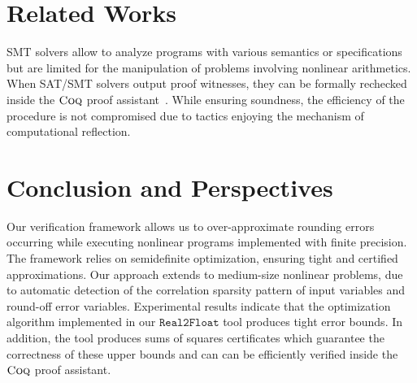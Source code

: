 \documentclass[preprint]{sigplanconf}
\newcommand{\realtofloat}{\mathtt{Real2Float}}
\newcommand{\op}{\mathtt{op}}
\newcommand{\coq}{\text{\sc Coq}}
\newcommand{\fptaylor}{\mathtt{FPTaylor}}
\theoremstyle{plain}
\begin{document}



\section{Related Works}
%
SMT solvers allow to analyze programs with various semantics or specifications but are limited for the manipulation of problems involving nonlinear arithmetics. When SAT/SMT solvers output proof witnesses, they can be formally rechecked inside the $\coq$ proof assistant~\cite{smtcoq}. While ensuring soundness, the efficiency of the procedure is not compromised due to tactics enjoying the mechanism of computational reflection.

\section{Conclusion and Perspectives} %
%
Our verification framework allows us to over-approximate rounding errors occurring while executing nonlinear programs implemented with finite precision.
The framework relies on semidefinite optimization, ensuring tight and certified approximations. Our approach extends to medium-size nonlinear problems, due to  automatic detection of the correlation sparsity pattern of input variables and round-off error variables. Experimental results indicate that the optimization algorithm implemented in our $\realtofloat$ tool produces tight error bounds. In addition, the tool produces sums of squares certificates which guarantee the correctness of these upper bounds and can can be efficiently verified inside the $\coq$ proof assistant.
\end{document}
